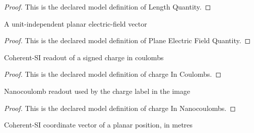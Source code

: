 \begin{proof}
  This is the declared model definition of Length Quantity.
\end{proof}
\begin{definition}
  \label{def:physics:phyx-mini-0903:phyxminiproblems-problemphyxmini0903-planeelectricfieldquantity}
  A unit-independent planar electric-field vector
\end{definition}
\begin{proof}
  This is the declared model definition of Plane Electric Field Quantity.
\end{proof}
\begin{definition}
  \label{def:physics:phyx-mini-0903:phyxminiproblems-problemphyxmini0903-chargeincoulombs}
  Coherent-SI readout of a signed charge in coulombs
\end{definition}
\begin{proof}
  This is the declared model definition of charge In Coulombs.
\end{proof}
\begin{definition}
  \label{def:physics:phyx-mini-0903:phyxminiproblems-problemphyxmini0903-chargeinnanocoulombs}
  Nanocoulomb readout used by the charge label in the image
\end{definition}
\begin{proof}
  This is the declared model definition of charge In Nanocoulombs.
\end{proof}
\begin{definition}
  \label{def:physics:phyx-mini-0903:phyxminiproblems-problemphyxmini0903-positioninmeters}
  Coherent-SI coordinate vector of a planar position, in metres
\end{definition}
